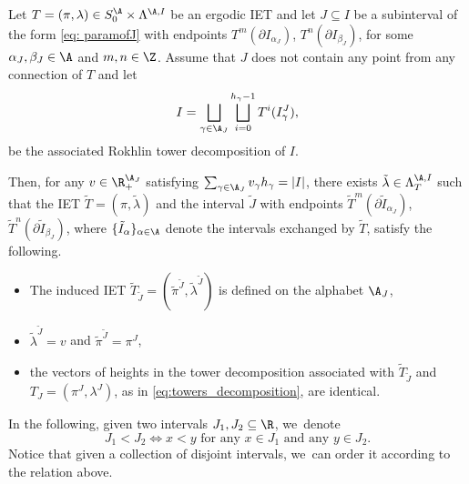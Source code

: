 \begin{proposition}
\label{prop: unwinding}
Let $T = (\pi, \lambda) \in S_0^\A \times \Lambda^{\A, I}$ be an ergodic IET and let $J \subseteq I$ be a subinterval of the form \eqref{eq: paramofJ} with endpoints $T^{m}(\partial I_{\alpha_J})$, $T^n(\partial I_{\beta_J})$, for some $\alpha_J, \beta_J \in \A$ and $m, n \in \Z$. Assume that $J$ does not contain any point from any connection of $T$ and let
\begin{equation}
\label{eq:initial_towers}
I = \bigsqcup_{\gamma \in \A_J} \bigsqcup_{i = 0}^{h_\gamma - 1} T^i(I_\gamma^J),
\end{equation}
be the associated Rokhlin tower decomposition of $I$.

Then, for any $v \in \R^{\A_J}_+$ satisfying $\sum_{\gamma \in \A_J} v_\gamma h_\gamma = |I|$, there exists $\tilde \lambda \in \Lambda^{\A, I}_T$ such that the IET $\tilde T = (\pi, \tilde \lambda)$ and the interval $\tilde J$ with endpoints $\tilde T^{m}(\partial \tilde I_{\alpha_J})$, $\tilde T^n(\partial \tilde I_{\beta_J})$, where $\{\tilde I_\alpha\}_{\alpha \in \A}$ denote the intervals exchanged by $\tilde T$, satisfy the following.
\begin{itemize}
\item The induced IET $\tilde T_{\tilde J}= (\tilde \pi ^{\tilde J}, \tilde \lambda ^{\tilde J})$ is defined on the alphabet $\A_J$,
\item $\tilde \lambda^{\tilde J} = v$ and $\tilde \pi^{\tilde J} = \pi^J$,
\item {the vectors of heights in the tower decomposition associated with $\tilde T_{\tilde J}$ and $T_J = (\pi^J, \lambda^J)$, as in \eqref{eq:towers_decomposition}, are identical.}
\end{itemize}
\end{proposition}

In the following, given two intervals $J_1, J_2 \subseteq \R$, we~denote
\begin{equation}\label{eq: defofintervalorder}
J_1<J_2\iff x<y \text{ for any }x\in J_1\text{ and any }y\in J_2.
\end{equation}
Notice that given a collection of disjoint intervals, we~can order it according to the relation above.

